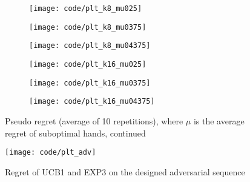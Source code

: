 \documentclass[a4paper]{article}
\begin{document}
\begin{figure}
  \centering
  \begin{subfigure}[b]{0.49\textwidth}
    \centering
    \texttt{[image: code/plt\_k8\_mu025]}
  \end{subfigure}
  \begin{subfigure}[b]{0.49\textwidth}
    \centering
    \texttt{[image: code/plt\_k8\_mu0375]}
  \end{subfigure}
  \begin{subfigure}[b]{0.49\textwidth}
    \centering
    \texttt{[image: code/plt\_k8\_mu04375]}
  \end{subfigure}
  \begin{subfigure}[b]{0.49\textwidth}
    \centering
    \texttt{[image: code/plt\_k16\_mu025]}
  \end{subfigure}
  \begin{subfigure}[b]{0.49\textwidth}
    \centering
    \texttt{[image: code/plt\_k16\_mu0375]}
  \end{subfigure}
  \begin{subfigure}[b]{0.49\textwidth}
    \centering
    \texttt{[image: code/plt\_k16\_mu04375]}
  \end{subfigure}
  \caption{Pseudo regret (average of 10 repetitions), where $\mu$ is the average
    regret of suboptimal hands, continued}
  \label{plt2}
\end{figure}
\begin{figure}
  \centering
    \texttt{[image: code/plt\_adv]}
  \caption{Regret of UCB1 and EXP3 on the designed adversarial sequence}
  \label{plt3}
\end{figure}
\end{document}
